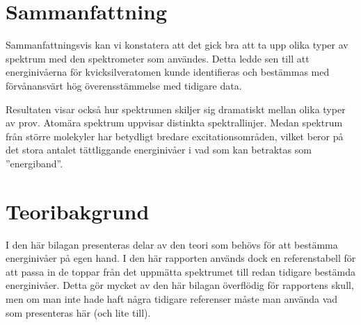 \documentclass[11pt,a4paper]{article}
\begin{document}




\section{Sammanfattning}
Sammanfattningsvis kan vi konstatera att det gick bra
att ta upp olika typer av spektrum med den spektrometer som
användes. Detta ledde sen till att energinivåerna för
kvicksilveratomen kunde identifieras och bestämmas med förvånansvärt
hög överensstämmelse med tidigare data. 

Resultaten visar också hur
spektrumen skiljer sig dramatiskt mellan olika typer av prov. Atomära
spektrum uppvisar distinkta spektrallinjer. Medan spektrum från större
molekyler har betydligt bredare excitationsområden, vilket beror på
det stora antalet tättliggande energinivåer i vad som kan betraktas
som ''energiband''. 




\newpage
{}




\clearpage
\appendix
\setcounter{page}{1}
\renewcommand*{\thepage}{A\arabic{page}}




\section{Teoribakgrund} \label{sec:teori}
I den här bilagan presenteras delar av den teori som behövs för att
bestämma energinivåer på egen hand. I den här rapporten används dock
en referenstabell för att passa in de toppar från det uppmätta
spektrumet till redan tidigare bestämda energinivåer. Detta gör mycket
av den här bilagan överflödig för rapportens skull, men om man inte
hade haft några tidigare referenser måste man använda vad som
presenteras här (och lite till).
\end{document}
